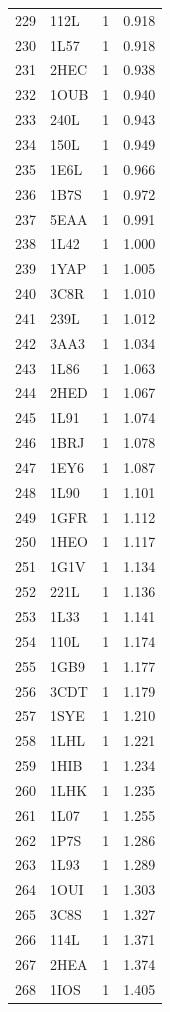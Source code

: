 \begin{longtable}{r l r r}
229 & 112L & 1 & 0.918 \\
230 & 1L57 & 1 & 0.918 \\
231 & 2HEC & 1 & 0.938 \\
232 & 1OUB & 1 & 0.940 \\
233 & 240L & 1 & 0.943 \\
234 & 150L & 1 & 0.949 \\
235 & 1E6L & 1 & 0.966 \\
236 & 1B7S & 1 & 0.972 \\
237 & 5EAA & 1 & 0.991 \\
238 & 1L42 & 1 & 1.000 \\
239 & 1YAP & 1 & 1.005 \\
240 & 3C8R & 1 & 1.010 \\
241 & 239L & 1 & 1.012 \\
242 & 3AA3 & 1 & 1.034 \\
243 & 1L86 & 1 & 1.063 \\
244 & 2HED & 1 & 1.067 \\
245 & 1L91 & 1 & 1.074 \\
246 & 1BRJ & 1 & 1.078 \\
247 & 1EY6 & 1 & 1.087 \\
248 & 1L90 & 1 & 1.101 \\
249 & 1GFR & 1 & 1.112 \\
250 & 1HEO & 1 & 1.117 \\
251 & 1G1V & 1 & 1.134 \\
252 & 221L & 1 & 1.136 \\
253 & 1L33 & 1 & 1.141 \\
254 & 110L & 1 & 1.174 \\
255 & 1GB9 & 1 & 1.177 \\
256 & 3CDT & 1 & 1.179 \\
257 & 1SYE & 1 & 1.210 \\
258 & 1LHL & 1 & 1.221 \\
259 & 1HIB & 1 & 1.234 \\
260 & 1LHK & 1 & 1.235 \\
261 & 1L07 & 1 & 1.255 \\
262 & 1P7S & 1 & 1.286 \\
263 & 1L93 & 1 & 1.289 \\
264 & 1OUI & 1 & 1.303 \\
265 & 3C8S & 1 & 1.327 \\
266 & 114L & 1 & 1.371 \\
267 & 2HEA & 1 & 1.374 \\
268 & 1IOS & 1 & 1.405 \\

\end{longtable}
